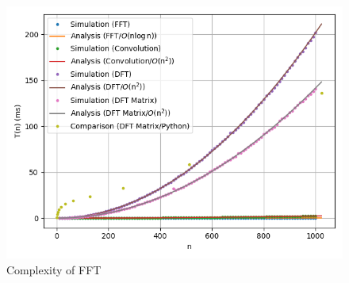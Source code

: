 \documentclass[journal,12pt,twocolumn]{IEEEtran}
\renewcommand\thesection{\arabic{section}}
\begin{document}
\begin{enumerate}[label=\thesection.\arabic*]
\begin{figure}[!htb]
	\includegraphics[width=\columnwidth]{figs/complexity.png}
	\caption{Complexity of FFT}
	\label{fig:FFT-com}
	\end{figure}
\end{enumerate}

\end{document}
